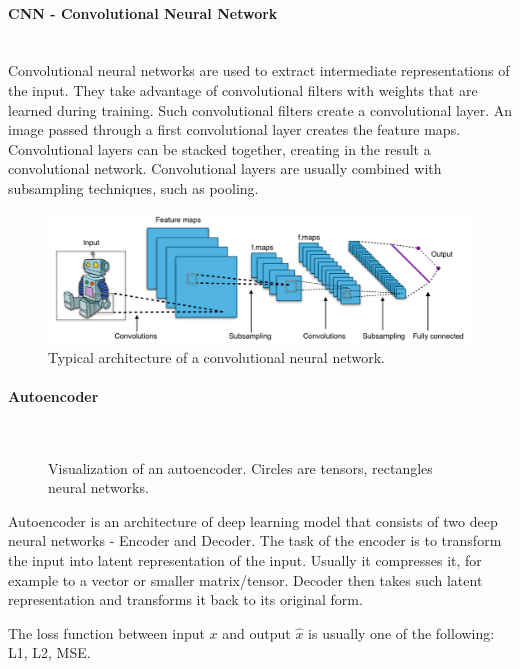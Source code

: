 \paragraph{CNN - Convolutional Neural Network}\mbox{}\\

Convolutional neural networks are used to extract intermediate representations of the input. They take advantage of convolutional filters with weights that are learned during training. Such convolutional filters create a convolutional layer. An image passed through a first convolutional layer creates the feature maps. Convolutional layers can be stacked together, creating in the result a convolutional network.
Convolutional layers are usually combined with subsampling techniques, such as pooling. 

\begin{figure}[H]
    \centering
    \includegraphics[width=\linewidth]{concept_engineering/Typical_cnn.png}
    \caption{Typical architecture of a convolutional neural network\cite{cnn-typical}.}
    \label{fig:cnn}
\end{figure}


\paragraph{Autoencoder}\mbox{}\\
\begin{figure}[H]
    \centering
    
    \caption{Visualization of an autoencoder. Circles are tensors, rectangles neural networks.}
    \label{fig:autoencoder}
\end{figure}
\indent Autoencoder is an architecture of deep learning model that consists of two deep neural networks - Encoder and Decoder. The task of the encoder is to transform the input into latent representation of the input. Usually it compresses it, for example to a vector or smaller matrix/tensor. Decoder then takes such latent representation and transforms it back to its original form. 

The loss function between input $x$ and output $\hat{x}$ is usually one of the following: L1, L2, MSE.

